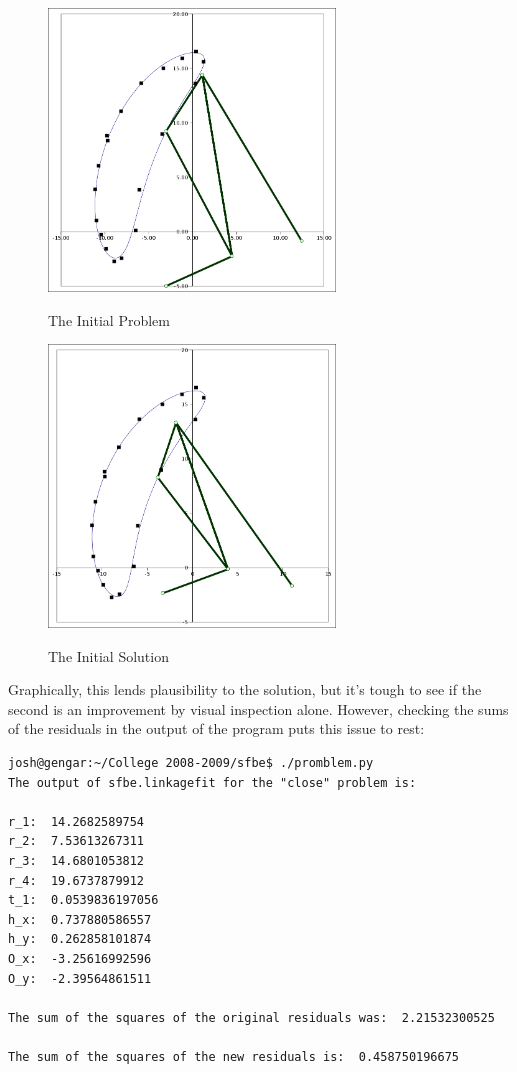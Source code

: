 \documentclass[12pt, letterpaper]{article}
\begin{document}
\begin{figure}[H]
\centering
\caption{The Initial Problem}
\includegraphics[width=3.0in]{initial_problem}
\label{fig:initial_problem}
\end{figure}

\begin{figure}[H]
\centering
\caption{The Initial Solution}
\includegraphics[width=3.0in]{initial_solution}
\label{fig:initial_solution}
\end{figure}

Graphically, this lends plausibility to the solution, but it's tough to see if the second is an improvement by visual inspection alone. However, checking the sums of the residuals in the output of the program puts this issue to rest:

\begin{verbatim}
josh@gengar:~/College 2008-2009/sfbe$ ./promblem.py
The output of sfbe.linkagefit for the "close" problem is:

r_1:  14.2682589754
r_2:  7.53613267311
r_3:  14.6801053812
r_4:  19.6737879912
t_1:  0.0539836197056
h_x:  0.737880586557
h_y:  0.262858101874
O_x:  -3.25616992596
O_y:  -2.39564861511

The sum of the squares of the original residuals was:  2.21532300525

The sum of the squares of the new residuals is:  0.458750196675
\end{verbatim}
\end{document}
